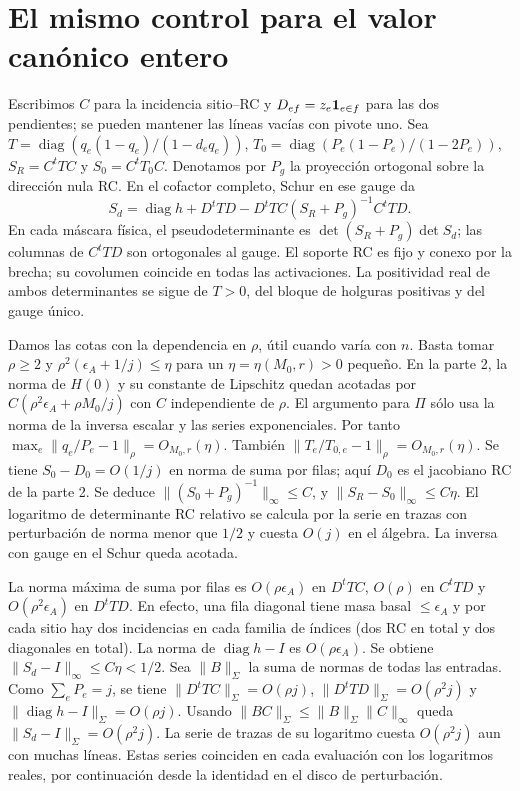 \section{El mismo control para el valor canónico entero}
Escribimos $C$ para la incidencia sitio--RC y $D_{ef}=z_e{\bf1}_{e\in f}$ para las
dos pendientes; se pueden mantener las líneas vacías con pivote uno. Sea
$T=\operatorname{diag}(q_e(1-q_e)/(1-d_e q_e))$,
$T_0=\operatorname{diag}(P_e(1-P_e)/(1-2P_e))$, $S_R=C^tTC$ y $S_0=C^tT_0 C$.
Denotamos por $P_g$ la proyección ortogonal sobre la dirección nula RC.
En el cofactor completo, Schur en ese gauge da
\[
 S_d=\operatorname{diag}h + D^tTD-D^tTC(S_R+P_g)^{-1} C^tTD .
\]
En cada máscara física, el pseudodeterminante es $\det(S_R+P_g)\det S_d$;
las columnas de $C^tTD$ son ortogonales al gauge. El soporte RC es fijo y conexo
por la brecha; su covolumen coincide en todas las activaciones. La positividad real de
ambos determinantes se sigue de $T>0$, del bloque de holguras positivas y del gauge único.

Damos las cotas con la dependencia en $\rho$, útil cuando varía con $n$. Basta tomar
$\rho\ge2$ y $\rho^2(\epsilon_A+1/j)\le\eta$ para un $\eta=\eta(M_0,r)>0$ pequeño.
En la parte 2, la norma de $H(0)$ y su constante de Lipschitz quedan acotadas por
$C(\rho^2\epsilon_A+\rho M_0/j)$ con $C$ independiente de $\rho$. El argumento
para $\Pi$ sólo usa la norma de la inversa escalar y las series exponenciales.
Por tanto $\max_e\|q_e/P_e-1\|_\rho=O_{M_0,r}(\eta)$.
También $\|T_e/T_{0,e}-1\|_\rho=O_{M_0,r}(\eta)$. Se tiene
$S_0-D_0=O(1/j)$ en norma de suma por filas; aquí $D_0$ es el jacobiano RC de
la parte 2. Se deduce $\|(S_0+P_g)^{-1}\|_\infty\le C$, y
$\|S_R-S_0\|_\infty\le C\eta$. El logaritmo de determinante RC relativo se
calcula por la serie en trazas con perturbación de norma menor que $1/2$ y cuesta
$O(j)$ en el álgebra. La inversa con gauge en el Schur queda acotada.

La norma máxima de suma por filas es $O(\rho\epsilon_A)$ en $D^tTC$,
$O(\rho)$ en $C^tTD$ y $O(\rho^2\epsilon_A)$ en $D^tTD$. En efecto, una fila diagonal
tiene masa basal $\le\epsilon_A$ y por cada sitio hay dos incidencias en cada familia de
índices (dos RC en total y dos diagonales en total). La norma de $\operatorname{diag}h-I$
es $O(\rho\epsilon_A)$. Se obtiene $\|S_d-I\|_\infty\le C\eta<1/2$. Sea $\|B\|_\Sigma$
la suma de normas de todas las entradas. Como $\sum_eP_e=j$, se tiene
$\|D^tTC\|_\Sigma=O(\rho j)$, $\|D^tTD\|_\Sigma=O(\rho^2j)$ y
$\|\operatorname{diag}h-I\|_\Sigma=O(\rho j)$. Usando
$\|BC\|_\Sigma\le\|B\|_\Sigma\|C\|_\infty$ queda $\|S_d-I\|_\Sigma=O(\rho^2j)$.
La serie de trazas de su logaritmo cuesta $O(\rho^2j)$ aun con muchas líneas.
Estas series coinciden en cada evaluación con los logaritmos reales, por continuación
desde la identidad en el disco de perturbación.


